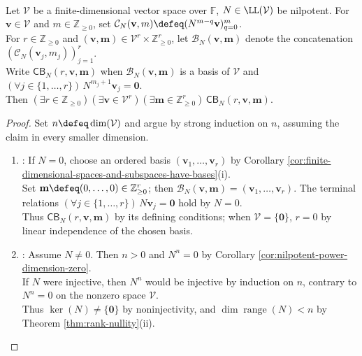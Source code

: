 \begin{theorem} \label{thm:nilpotent-jordan-chain-basis} \\
Let $\mathcal{V}$ be a finite-dimensional vector space over $\mathbb{F}$,  $N\in\LL(\mathcal{V})$ be nilpotent. For $\mathbf{v}\in\mathcal{V}$ and $m\in\mathbb{Z}_{\geq0}$, set $\mathcal{C}_N(\mathbf{v},m)\defeq(N^{m-q}\mathbf{v})_{q=0}^{m}$.\\
For $r\in\mathbb{Z}_{\geq0}$ and $(\mathbf{v},\mathbf{m})\in\mathcal{V}^r\times\mathbb{Z}_{\geq0}^r$, let $\mathcal{B}_N(\mathbf{v},\mathbf{m})$ denote the concatenation $(\mathcal{C}_N(\mathbf{v}_j,m_j))_{j=1}^{r}$.\\
Write $\mathsf{CB}_N(r,\mathbf{v},\mathbf{m})$ when $\mathcal{B}_N(\mathbf{v},\mathbf{m})$ is a basis of $\mathcal{V}$ and $(\forall j\in\{1,\ldots,r\})\,N^{m_j+1}\mathbf{v}_j=\mathbf{0}$.\\
Then $(\exists r\in\mathbb{Z}_{\geq0})(\exists\mathbf{v}\in\mathcal{V}^r)(\exists\mathbf{m}\in\mathbb{Z}_{\geq0}^r)\,\mathsf{CB}_N(r,\mathbf{v},\mathbf{m})$.
\begin{proof}
Set $n\defeq\dim(\mathcal{V})$ and argue by strong induction on $n$, assuming the claim in every smaller dimension.
\begin{enumerate}[label=(\roman*)]
\setlength{\itemsep}{0pt}
\item {}: If $N=0$, choose an ordered basis $(\mathbf{v}_1,\ldots,\mathbf{v}_r)$ by Corollary \ref{cor:finite-dimensional-spaces-and-subspaces-have-bases}(i).\\
Set $\mathbf{m}\defeq(0,\ldots,0)\in\mathbb{Z}_{\geq0}^r$; then $\mathcal{B}_N(\mathbf{v},\mathbf{m})=(\mathbf{v}_1,\ldots,\mathbf{v}_r)$. The terminal relations $(\forall j\in\{1,\ldots,r\})\,N\mathbf{v}_j=\mathbf{0}$ hold by $N=0$.\\
Thus $\mathsf{CB}_N(r,\mathbf{v},\mathbf{m})$ by its defining conditions; when $\mathcal{V}=\{\mathbf{0}\}$, $r=0$ by linear independence of the chosen basis.
\item {}: Assume $N\neq0$. Then $n>0$ and $N^n=0$ by Corollary \ref{cor:nilpotent-power-dimension-zero}.\\
If $N$ were injective, then $N^n$ would be injective by induction on $n$, contrary to $N^n=0$ on the nonzero space $\mathcal{V}$.\\
Thus $\ker(N)\neq\{\mathbf{0}\}$ by noninjectivity, and $\dim\operatorname{range}(N)<n$ by Theorem \ref{thm:rank-nullity}(ii).\\

\end{enumerate}
\end{proof}
\end{theorem}
